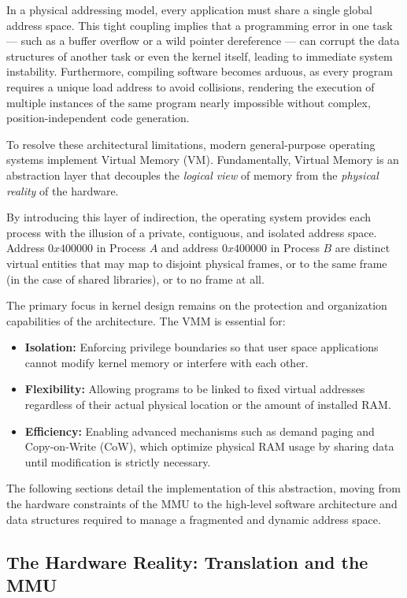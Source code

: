 \documentclass[a4paper,10pt,twoside]{report}
\theoremstyle{definition}
\begin{document}
In a physical addressing model, every application must share a single global address space. This tight coupling implies that a programming error in one task --- such as a buffer overflow or a wild pointer dereference --- can corrupt the data structures of another task or even the kernel itself, leading to immediate system instability. Furthermore, compiling software becomes arduous, as every program requires a unique load address to avoid collisions, rendering the execution of multiple instances of the same program nearly impossible without complex, position-independent code generation.

To resolve these architectural limitations, modern general-purpose operating systems implement Virtual Memory (VM). Fundamentally, Virtual Memory is an abstraction layer that decouples the \textit{logical view} of memory from the \textit{physical reality} of the hardware. 

By introducing this layer of indirection, the operating system provides each process with the illusion of a private, contiguous, and isolated address space. Address $0x400000$ in Process $A$ and address $0x400000$ in Process $B$ are distinct virtual entities that may map to disjoint physical frames, or to the same frame (in the case of shared libraries), or to no frame at all.

The primary focus in kernel design remains on the protection and organization capabilities of the architecture. The VMM is essential for:
\begin{itemize}
    \item \textbf{Isolation:} Enforcing privilege boundaries so that user space applications cannot modify kernel memory or interfere with each other.
    \item \textbf{Flexibility:} Allowing programs to be linked to fixed virtual addresses regardless of their actual physical location or the amount of installed RAM.
    \item \textbf{Efficiency:} Enabling advanced mechanisms such as demand paging and Copy-on-Write (CoW), which optimize physical RAM usage by sharing data until modification is strictly necessary.
\end{itemize}

The following sections detail the implementation of this abstraction, moving from the hardware constraints of the MMU to the high-level software architecture and data structures required to manage a fragmented and dynamic address space.


\subsection{The Hardware Reality: Translation and the MMU}
\label{subsec:vmm_hardware}
\end{document}
